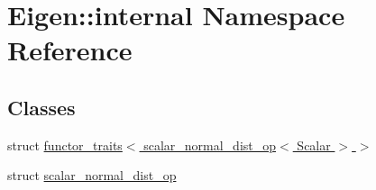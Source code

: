 \hypertarget{namespace_eigen_1_1internal}{\section{Eigen\+:\+:internal Namespace Reference}
\label{namespace_eigen_1_1internal}
}
\subsection*{Classes}
\begin{DoxyCompactItemize}
\item 
struct \hyperlink{struct_eigen_1_1internal_1_1functor__traits_3_01scalar__normal__dist__op_3_01_scalar_01_4_01_4}{functor\+\_\+traits$<$ scalar\+\_\+normal\+\_\+dist\+\_\+op$<$ Scalar $>$ $>$}
\item 
struct \hyperlink{struct_eigen_1_1internal_1_1scalar__normal__dist__op}{scalar\+\_\+normal\+\_\+dist\+\_\+op}
\end{DoxyCompactItemize}
